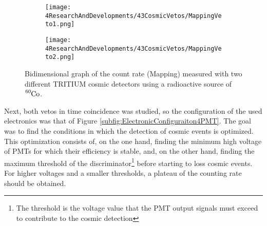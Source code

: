 \begin{enumerate}

\begin{figure}
\centering
    \begin{subfigure}[b]{0.9\textwidth}
    \centering
    \texttt{[image: 4ResearchAndDevelopments/43CosmicVetos/MappingVeto1.png]}  
    \caption{\label{subfig:MappingVeto1}}
    \end{subfigure}
    \hfill
    \begin{subfigure}[b]{0.9\textwidth}
    \centering
    \texttt{[image: 4ResearchAndDevelopments/43CosmicVetos/MappingVeto2.png]}  
    \caption{\label{subfig:MappingVeto2}}
    \end{subfigure}
 \caption{Bidimensional graph of the count rate (Mapping) measured with two different TRITIUM cosmic detectors using a radioactive source of  $\ce{^{60}Co}$.}
 \label{fig:MappingVetos}
\end{figure}

\end{enumerate}

Next, both vetos in time coincidence was studied, so the configuration of the used electronics was that of Figure \ref{subfig:ElectronicConfiguraiton4PMT}. The goal was to find the conditions in which the detection of cosmic events is optimized. This optimization consists of, on the one hand, finding the minimum high voltage of PMTs for which their efficiency is stable, and, on the other hand, finding the maximum threshold of the discriminator\footnote{The threshold is the voltage value that the PMT output signals must exceed to contribute to the cosmic detection} before starting to loss cosmic events. For higher voltages and a smaller thresholds, a plateau of the counting rate should be obtained.

